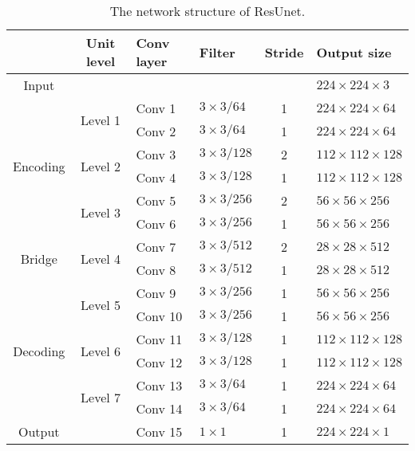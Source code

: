 \documentclass[journal]{IEEEtran}
\begin{document}
\begin{table}[!htb]
	\tiny
	\centering
	\caption{The network structure of ResUnet.}	
	\label{Table:Feature Size}	
	\begin{tabular}{ccllcl}
		\hline
		\hline
		& Unit level  & Conv layer & Filter  & Stride &  Output size\\
		\hline
		Input                      &        &     &   &    &  $224\times 224 \times 3$ \\
		\hline	
		\multirow{6}{*}{Encoding}
		& \multirow{2}{*}{Level 1}& Conv 1  & $3\times 3/64$ & 1 &  $224\times 224 \times 64$ \\
		&        & Conv 2  &  $3\times 3/64$ & 1 &  $224\times 224 \times 64$ \\
		\cline{2-6}			
		& \multirow{2}{*}{Level 2}& Conv 3  &  $3\times 3/128$ & 2 &  $112\times 112 \times 128$ \\
		&        & Conv 4  &  $3\times 3/128$ & 1 &  $112\times 112 \times 128$ \\
		\cline{2-6}
		& \multirow{2}{*}{Level 3}& Conv 5  &  $3\times 3/256$ & 2 &  $56\times 56 \times 256$ \\
		&        & Conv 6  &  $3\times 3/256$ & 1 &  $56\times 56 \times 256$ \\
		\cline{2-6}						
		\hline
		\multirow{2}{*}{Bridge}
		&\multirow{2}{*}{Level 4}         &Conv 7  &  $3\times 3/512$ & 2 &  $28\times 28 \times 512$ \\
		&	      &Conv 8 &  $3\times 3/512$ & 1 &  $28\times 28 \times 512$\\
		\hline
		\multirow{6}{*}{Decoding}	
		& \multirow{2}{*}{Level 5} &Conv 9 &  $3\times 3/256$ & 1 &  $56\times 56 \times 256$ \\
		&        &Conv 10 &  $3\times 3/256$ & 1 & $56\times 56 \times 256$ \\
		\cline{2-6}
		& \multirow{2}{*}{Level 6} &Conv 11 &  $3\times 3/128$ & 1 &  $112\times 112 \times 128$ \\
		&        &Conv 12 &  $3\times 3/128$ & 1 &  $112\times 112 \times 128$ \\
		\cline{2-6}			
		& \multirow{2}{*}{Level 7} &Conv 13 &  $3\times 3/64$ & 1 &   $224\times 224 \times 64$ \\
		&        &Conv 14 &  $3\times 3/64$ & 1 &  $224\times 224 \times 64$ \\
		\hline
		Output                      &        &Conv 15 &  $1\times 1$ & 1 &  $224\times 224 \times 1$ \\		
		\hline
		\hline
	\end{tabular}
	\vspace{-0.6cm}
\end{table}
\end{document}
